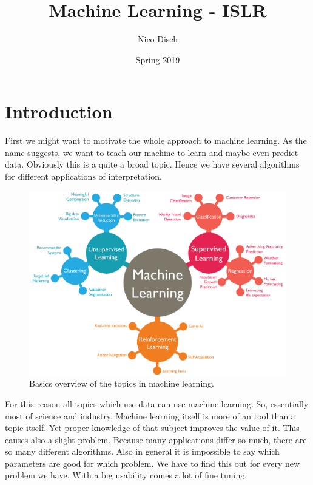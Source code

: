 \documentclass{article}
\title{Machine Learning - ISLR}
\author{Nico Disch }
\date{Spring 2019}
\begin{document}
\maketitle
\newpage
\tableofcontents
\newpage


\section{Introduction}
First  we might want to motivate the whole approach to machine learning. As the name suggests, we want to teach our machine to learn and maybe even predict data. Obviously this is a quite a broad topic. Hence we have several algorithms for different applications of interpretation.

\begin{figure}[ht]
    \centering
    \includegraphics[width=\textwidth]{machine_learning.png}
    \caption{Basics overview of the topics in machine learning.}
    \label{fig_ml_overview_introduction}
\end{figure}

\par

For this reason all topics which use data can use machine learning. So, essentially most of science and industry.
Machine learning itself is more of an tool than a topic itself. Yet proper knowledge of that subject improves the value of it. This causes also a slight problem. Because many applications differ so much, there are so many different algorithms. Also in general it is impossible to say which parameters are good for which problem. We have to find this out for every new problem we have. With a big usability comes a lot of fine tuning. 
\end{document}
